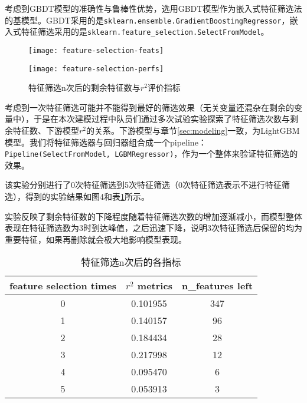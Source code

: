 \documentclass[bwprint]{gmcmthesis}
\begin{document}
考虑到GBDT模型的准确性与鲁棒性优势，选用GBDT模型作为嵌入式特征筛选法的基模型。GBDT采用的是\texttt{sklearn.ensemble.GradientBoostingRegressor}，嵌入式特征筛选采用的是\texttt{sklearn.feature\_selection.SelectFromModel}。

\begin{figure}[htb]
	\centering
	\begin{minipage}[c]{0.4\textwidth}
		\centering
		\texttt{[image: feature-selection-feats]}
	\end{minipage}
	\begin{minipage}[c]{0.4\textheight}
		\centering
		\texttt{[image: feature-selection-perfs]}
	\end{minipage}
	\caption{特征筛选n次后的剩余特征数与$r^2$评价指标}
\end{figure}

考虑到一次特征筛选可能并不能得到最好的筛选效果（无关变量还混杂在剩余的变量中），于是在本次建模过程中队员们通过多次试验实验探索了特征筛选次数与剩余特征数、下游模型$r^2$的关系。下游模型与章节\ref{sec:modeling}一致，为LightGBM模型。我们将特征筛选器与回归器组合成一个pipeline： \texttt{Pipeline(SelectFromModel, LGBMRegressor)}，作为一个整体来验证特征筛选的效果。

该实验分别进行了0次特征筛选到5次特征筛选（0次特征筛选表示不进行特征筛选），得到的实验结果如图4和表\ref{tab:002}所示。

实验反映了剩余特征数的下降程度随着特征筛选次数的增加逐渐减小，而模型整体表现在特征筛选数为3时到达峰值，之后迅速下降，说明3次特征筛选后保留的均为重要特征，如果再删除就会极大地影响模型表现。

\begin{table}[!htbp]
	\caption{特征筛选n次后的各指标}\label{tab:002} \centering
	\begin{tabular}{ccc}
		\toprule[1.5pt]
	feature selection times &  $r^2$ metrics &  n\_features left \\
		\midrule[1pt]
           0 &       0.101955 &              347 \\
			1 &       0.140157 &               96 \\
			2 &       0.184434 &               28 \\
			3 &       0.217998 &               12 \\
			4 &       0.095470 &                6 \\
			5 &       0.053913 &                3 \\
		\bottomrule[1.5pt]
	\end{tabular}
\end{table}
\end{document}
